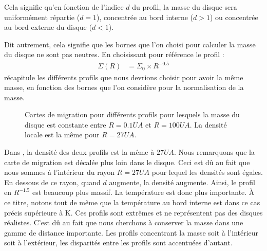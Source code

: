 Cela signifie qu'en fonction de l'indice $d$ du profil, la masse du disque sera uniformément répartie ($d=1$), concentrée au bord interne ($d>1$) ou concentrée au bord externe du disque ($d<1$). 

Dit autrement, cela signifie que les bornes que l'on choisi pour calculer la masse du disque ne sont pas neutres. En choisissant pour référence le profil : 
\begin{align}
\Sigma(R) &= \Sigma_0 \times R^{-0.5}
\end{align}
 récapitule les différents profils que nous devrions choisir pour avoir la même masse, en fonction des bornes que l'on considère pour la normalisation de la masse. 

\begin{figure}[htbp]
\centering
{}\hfill
{}

\caption[Cartes de migration pour différents profils de densité extrêmes, la masse du disque étant la même entre 0.1 et 100
UA.]{Cartes de migration pour différents profils pour lesquels la masse du disque est constante entre $R=0.1\unit{UA}$ et
$R=100\unit{UA}$. La densité locale est la même pour $R=27\unit{UA}$. }\label{fig:map_mtot_01_100}
\end{figure}

Dans , la densité des deux profils est la même à $27\unit{UA}$. Nous remarquons que la carte de migration est décalée plus loin dans le disque. Ceci est dû au fait que nous sommes à l'intérieur du rayon $R=27\unit{UA}$ pour lequel les densités sont égales. En dessous de ce rayon, quand $d$ augmente, la densité augmente. Ainsi, le profil en $R^{-1.5}$ est beaucoup plus massif. La température est donc plus importante. À ce titre, notons tout de même que la température au bord interne est dans ce cas précis supérieure à  K. Ces profils sont extrêmes et ne représentent pas des disques réalistes. C'est dû au fait que nous cherchons à conserver la masse dans une gamme de distance importante. Les profils concentrant la masse soit à l'intérieur soit à l'extérieur, les disparités entre les profils sont accentuées d'autant. 

